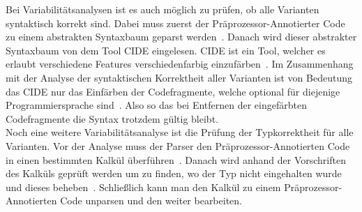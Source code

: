 Bei Variabilitätsanalysen ist es auch möglich zu prüfen, ob alle Varianten syntaktisch korrekt sind. Dabei muss zuerst der Präprozessor-Annotierter Code zu einem abstrakten Syntaxbaum geparst werden~\cite{KAK:ICSE08}. Danach wird dieser abstrakter Syntaxbaum von dem Tool CIDE eingelesen. CIDE ist ein Tool, welcher es erlaubt verschiedene Features verschiedenfarbig einzufärben~\cite{KAK:ICSE08}. Im Zusammenhang mit der Analyse der syntaktischen Korrektheit aller Varianten ist von Bedeutung das CIDE nur das Einfärben der Codefragmente, welche optional für diejenige Programmiersprache sind~\cite{KAK:ICSE08}. Also so das bei Entfernen der eingefärbten Codefragmente die Syntax trotzdem gültig bleibt. \\

Noch eine weitere Variabilitätsanalyse ist die Prüfung der Typkorrektheit für alle Varianten. Vor der Analyse muss der Parser den Präprozessor-Annotierten Code in einen bestimmten Kalkül überführen~\cite{KA:ASE08}. Danach wird anhand der Vorschriften des Kalküls geprüft werden um zu finden, wo der Typ nicht eingehalten wurde und dieses beheben~\cite{KA:ASE08}. Schließlich kann man den Kalkül zu einem Präprozessor-Annotierten Code unparsen und den weiter bearbeiten.






